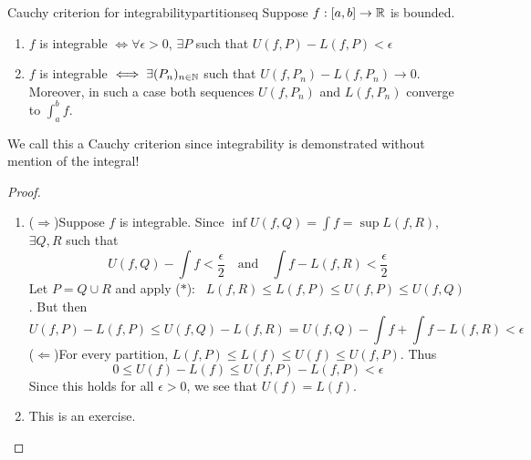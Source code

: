 \begin{thm}{Cauchy criterion for integrability}{partitionseq}
Suppose $f:[a,b]\to\mathbb{R}$ is bounded.
\begin{enumerate}
  \item $f$ is integrable $\iff\forall\epsilon>0$, $\exists P$ such that $U(f,P)-L(f,P)<\epsilon$
  \item $f$ is integrable $\iff\exists (P_n)_{n\in\mathbb{N}}$ such that $U(f,P_n)-L(f,P_n)\to 0$. Moreover, in such a case both sequences $U(f,P_n)$ and $L(f,P_n)$ converge to $\int_a^bf$.
\end{enumerate} 
\end{thm}

We call this a Cauchy criterion since integrability is demonstrated without mention of the integral! 


\begin{proof}
\begin{enumerate}
	\item ($\Rightarrow$)\quad Suppose $f$ is integrable. Since $\inf U(f,Q)=\int f=\sup L(f,R)$, $\exists Q,R$ such that
	\[U(f,Q)-\int f<\frac\epsilon 2\quad\text{and}\quad \int f-L(f,R)<\frac \epsilon 2\]
	Let $P=Q\cup R$ and apply ($\ast$): \ $L(f,R)\le L(f,P)\le U(f,P)\le U(f,Q)$. But then
	\[U(f,P)-L(f,P)\le U(f,Q)-L(f,R) =U(f,Q)-\int f+\int f-L(f,R)<\epsilon\]
	($\Leftarrow$)\quad For every partition, $L(f,P)\le L(f)\le U(f)\le U(f,P)$. Thus
	\[0\le U(f)-L(f)\le U(f,P)-L(f,P)<\epsilon\]
	Since this holds for all $\epsilon>0$, we see that $U(f)=L(f)$.
	\item This is an exercise.\qedhere
\end{enumerate}
\end{proof}

\goodbreak


